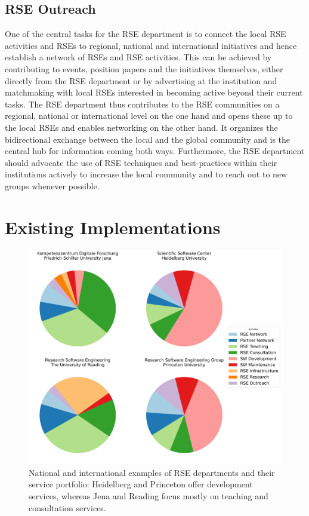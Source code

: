 \documentclass[a4paper]{article}
\begin{document}
\subsection{RSE Outreach}
\label{sec:outreach}

One of the central tasks for the RSE department is to connect the local RSE activities and RSEs to regional, national and international initiatives and hence establish a network of RSEs and RSE activities.
This can be achieved by contributing to events, position papers and the initiatives themselves,
either directly from the RSE department or by advertising at the institution and matchmaking with local RSEs interested in becoming active beyond their current tasks.
The RSE department thus contributes to the RSE communities on a regional, national or international level on the one hand and opens these up to the local RSEs and enables networking on the other hand.
It organizes the bidirectional exchange between the local and the global community and is the central hub for information coming both ways.
Furthermore, the RSE department should advocate the use of RSE techniques and best-practices within their institutions actively to increase the local community and to reach out to new groups whenever possible.

\section{Existing Implementations}

\begin{figure}
\label{fig:survey}
\centering
\includegraphics[width=\textwidth]{./group_composition_plot/pdf/group_composition_plot_the_fantastic_four.pdf}
\caption{National and international examples of RSE departments and their service portfolio: Heidelberg and Princeton offer development services, whereas Jena and Reading focus mostly on teaching and consultation services.}
\end{figure}
\end{document}
